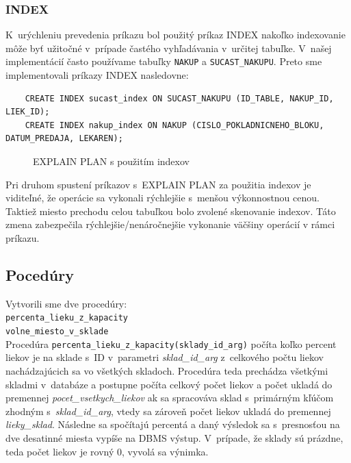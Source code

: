\documentclass[a4paper, 11pt]{article}
\begin{document}
        \subsubsection{INDEX}
        K~urýchleniu prevedenia príkazu bol použitý príkaz INDEX nakoľko indexovanie môže byť užitočné v~prípade častého vyhľadávania v~určitej tabuľke. V~našej implementácií často používame tabuľky \texttt{NAKUP} a \texttt{SUCAST\_NAKUPU}. 
        Preto sme implementovali príkazy INDEX nasledovne: \newpage
    \begin{lstlisting}
    CREATE INDEX sucast_index ON SUCAST_NAKUPU (ID_TABLE, NAKUP_ID, LIEK_ID);
    CREATE INDEX nakup_index ON NAKUP (CISLO_POKLADNICNEHO_BLOKU, DATUM_PREDAJA, LEKAREN);
    \end{lstlisting}
	\begin{figure}[h]
		\centering
		\caption{EXPLAIN PLAN s použitím indexov}
	\end{figure}
        Pri druhom spustení príkazov s~EXPLAIN PLAN za použitia indexov je viditeľné, že operácie sa vykonali rýchlejšie s~menšou výkonnostnou cenou. Taktiež miesto prechodu celou tabuľkou bolo zvolené skenovanie indexov. Táto zmena zabezpečila rýchlejšie/nenáročnejšie vykonanie väčšiny operácií v rámci príkazu.
	
	\subsection{Pocedúry} 
	Vytvorili sme dve procedúry:\\
	\texttt{percenta\_lieku\_z\_kapacity}\\
 	\texttt{volne\_miesto\_v\_sklade}\\
	
	Procedúra \texttt{percenta\_lieku\_z\_kapacity(sklady\_id\_arg)} počíta koľko percent liekov je na sklade s~ID v~parametri \emph{sklad\_id\_arg} z~celkového počtu liekov nachádzajúcich sa vo všetkých skladoch. Procedúra teda prechádza všetkými skladmi v~databáze a postupne počíta celkový počet liekov a počet ukladá do premennej \emph{pocet\_vsetkych\_liekov} ak sa spracováva sklad s~primárným kľúčom zhodným 
s~\emph{sklad\_id\_arg}, vtedy sa zároveň počet liekov ukladá do premennej \emph{lieky\_sklad}. Následne sa spočítajú percentá a daný výsledok sa s~presnosťou na dve desatinné miesta vypíše na DBMS výstup. V~prípade, že sklady sú prázdne, teda počet liekov je rovný 0, vyvolá sa výnimka.\\
	
\end{document}
